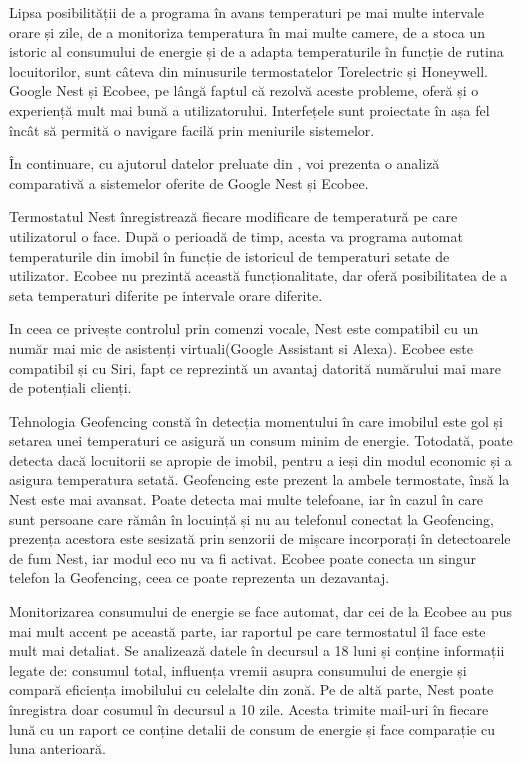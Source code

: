 	Lipsa posibilității de a programa în avans temperaturi pe mai multe intervale orare și zile, de a monitoriza temperatura în mai multe camere, de a stoca un istoric al consumului de energie și de a adapta temperaturile în funcție de rutina locuitorilor, sunt câteva din minusurile termostatelor Torelectric și Honeywell. Google Nest și Ecobee, pe lângă faptul că rezolvă aceste probleme, oferă și o experiență mult mai bună a utilizatorului. Interfețele sunt proiectate în așa fel încât să permită o navigare facilă prin meniurile sistemelor.  

	În continuare, cu ajutorul datelor preluate din \cite{ecobeeVSnest}, voi prezenta o analiză comparativă a sistemelor oferite de Google Nest și Ecobee. 

	Termostatul Nest înregistrează fiecare modificare de temperatură pe care utilizatorul o face. După o perioadă de timp, acesta va programa automat temperaturile din imobil în funcție de istoricul de temperaturi setate de utilizator. Ecobee nu prezintă această funcționalitate, dar oferă posibilitatea de a seta temperaturi diferite pe intervale orare diferite. 

	In ceea ce privește controlul prin comenzi vocale, Nest este compatibil cu un număr mai mic de asistenți virtuali(Google Assistant si Alexa). Ecobee este compatibil și cu Siri, fapt ce reprezintă un avantaj datorită numărului mai mare de potențiali clienți. 

	Tehnologia Geofencing constă în detecția momentului în care imobilul este gol și setarea unei temperaturi ce asigură un consum minim de energie. Totodată, poate detecta dacă locuitorii se apropie de imobil, pentru a ieși din modul economic și a asigura temperatura setată. Geofencing este prezent la ambele termostate, însă la Nest este mai avansat. Poate detecta mai multe telefoane, iar în cazul în care sunt persoane care rămân în locuință și nu au telefonul conectat la Geofencing, prezența acestora este sesizată prin senzorii de mișcare incorporați în detectoarele de fum Nest, iar modul eco nu va fi activat. Ecobee poate conecta un singur telefon la Geofencing, ceea ce poate reprezenta un dezavantaj.

	  Monitorizarea consumului de energie se face automat, dar cei de la Ecobee au pus mai mult accent pe această parte, iar raportul pe care termostatul îl face este mult mai detaliat. Se analizează datele în decursul a 18 luni și conține informații legate de: consumul total, influența vremii asupra consumului de energie și compară eficiența imobilului cu celelalte din zonă. Pe de altă parte, Nest poate înregistra doar cosumul în decursul a 10 zile. Acesta trimite mail-uri în fiecare lună cu un raport ce conține detalii de consum de energie și face comparație cu luna anterioară.

